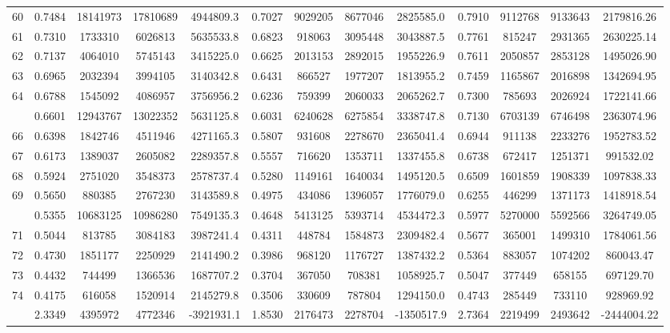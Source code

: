 \documentclass[
  12pt,
]{article}
\begin{document}
\begin{longtable}[t]{lcccccccccccc}
60 & 0.7484 & 18141973 & 17810689 & 4944809.3 & 0.7027 & 9029205 & 8677046 & 2825585.0 & 0.7910 & 9112768 & 9133643 & 2179816.26\\
61 & 0.7310 & 1733310 & 6026813 & 5635533.8 & 0.6823 & 918063 & 3095448 & 3043887.5 & 0.7761 & 815247 & 2931365 & 2630225.14\\
62 & 0.7137 & 4064010 & 5745143 & 3415225.0 & 0.6625 & 2013153 & 2892015 & 1955226.9 & 0.7611 & 2050857 & 2853128 & 1495026.90\\
63 & 0.6965 & 2032394 & 3994105 & 3140342.8 & 0.6431 & 866527 & 1977207 & 1813955.2 & 0.7459 & 1165867 & 2016898 & 1342694.95\\
64 & 0.6788 & 1545092 & 4086957 & 3756956.2 & 0.6236 & 759399 & 2060033 & 2065262.7 & 0.7300 & 785693 & 2026924 & 1722141.66\\
\addlinespace
65 & 0.6601 & 12943767 & 13022352 & 5631125.8 & 0.6031 & 6240628 & 6275854 & 3338747.8 & 0.7130 & 6703139 & 6746498 & 2363074.96\\
66 & 0.6398 & 1842746 & 4511946 & 4271165.3 & 0.5807 & 931608 & 2278670 & 2365041.4 & 0.6944 & 911138 & 2233276 & 1952783.52\\
67 & 0.6173 & 1389037 & 2605082 & 2289357.8 & 0.5557 & 716620 & 1353711 & 1337455.8 & 0.6738 & 672417 & 1251371 & 991532.02\\
68 & 0.5924 & 2751020 & 3548373 & 2578737.4 & 0.5280 & 1149161 & 1640034 & 1495120.5 & 0.6509 & 1601859 & 1908339 & 1097838.33\\
69 & 0.5650 & 880385 & 2767230 & 3143589.8 & 0.4975 & 434086 & 1396057 & 1776079.0 & 0.6255 & 446299 & 1371173 & 1418918.54\\
\addlinespace
70 & 0.5355 & 10683125 & 10986280 & 7549135.3 & 0.4648 & 5413125 & 5393714 & 4534472.3 & 0.5977 & 5270000 & 5592566 & 3264749.05\\
71 & 0.5044 & 813785 & 3084183 & 3987241.4 & 0.4311 & 448784 & 1584873 & 2309482.4 & 0.5677 & 365001 & 1499310 & 1784061.56\\
72 & 0.4730 & 1851177 & 2250929 & 2141490.2 & 0.3986 & 968120 & 1176727 & 1387432.2 & 0.5364 & 883057 & 1074202 & 860043.47\\
73 & 0.4432 & 744499 & 1366536 & 1687707.2 & 0.3704 & 367050 & 708381 & 1058925.7 & 0.5047 & 377449 & 658155 & 697129.70\\
74 & 0.4175 & 616058 & 1520914 & 2145279.8 & 0.3506 & 330609 & 787804 & 1294150.0 & 0.4743 & 285449 & 733110 & 928969.92\\
\addlinespace
75 & 2.3349 & 4395972 & 4772346 & -3921931.1 & 1.8530 & 2176473 & 2278704 & -1350517.9 & 2.7364 & 2219499 & 2493642 & -2444004.22\\*
\end{longtable}
\endgroup{}
\end{document}
